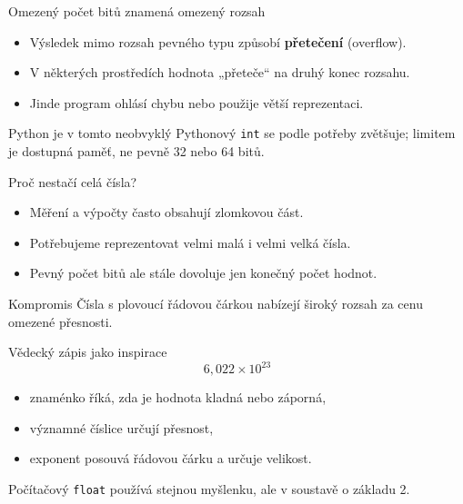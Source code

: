 \documentclass[aspectratio=169]{beamer}
\newcommand{\term}[1]{\textcolor{CodeBlue}{\textbf{#1}}}
\begin{document}
\begin{frame}{Omezený počet bitů znamená omezený rozsah}
  \begin{itemize}
    \item Výsledek mimo rozsah pevného typu způsobí \term{přetečení} (overflow).
    \item V některých prostředích hodnota „přeteče“ na druhý konec rozsahu.
    \item Jinde program ohlásí chybu nebo použije větší reprezentaci.
  \end{itemize}
  \begin{alertblock}{Python je v tomto neobvyklý}
    Pythonový \texttt{int} se podle potřeby zvětšuje; limitem je dostupná paměť, ne pevně 32 nebo 64 bitů.
  \end{alertblock}
\end{frame}

\begin{frame}{Proč nestačí celá čísla?}
  \begin{itemize}
    \item Měření a výpočty často obsahují zlomkovou část.
    \item Potřebujeme reprezentovat velmi malá i velmi velká čísla.
    \item Pevný počet bitů ale stále dovoluje jen konečný počet hodnot.
  \end{itemize}
  \begin{block}{Kompromis}
    Čísla s plovoucí řádovou čárkou nabízejí široký rozsah za cenu omezené přesnosti.
  \end{block}
\end{frame}

\begin{frame}{Vědecký zápis jako inspirace}
  \[
    6{,}022\times10^{23}
  \]
  \begin{itemize}
    \item znaménko říká, zda je hodnota kladná nebo záporná,
    \item významné číslice určují přesnost,
    \item exponent posouvá řádovou čárku a určuje velikost.
  \end{itemize}
  \vspace{3mm}
  Počítačový \texttt{float} používá stejnou myšlenku, ale v soustavě o základu 2.
\end{frame}
\end{document}
